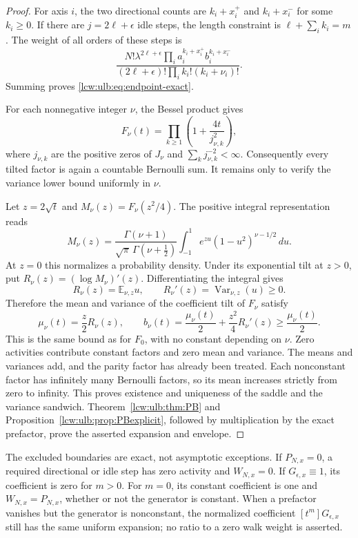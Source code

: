 \documentclass[11pt,letterpaper]{article}
\theoremstyle{remark}\newtheorem{remark}[theorem]{Remark}
\begin{document}
\begin{proof}
For axis $i$, the two directional counts are
$k_i+x_i^+$ and $k_i+x_i^-$ for some $k_i\ge0$. If there are
$j=2\ell+\epsilon$ idle steps, the length constraint is
$\ell+\sum_i k_i=m$. The weight of all orders of these steps is
\[
 \frac{N!\lambda^{2\ell+\epsilon}
           \prod_i a_i^{k_i+x_i^+}b_i^{k_i+x_i^-}}
      {(2\ell+\epsilon)!\prod_i k_i!(k_i+\nu_i)!}.
\]
Summing proves \eqref{lcw:ulb:eq:endpoint-exact}.

For each nonnegative integer $\nu$, the Bessel product
\cite{dlmfzeros} gives
\[
 F_\nu(t)=\prod_{k\ge1}
           \left(1+\frac{4t}{j_{\nu,k}^2}\right),
\]
where $j_{\nu,k}$ are the positive zeros of $J_\nu$ and
$\sum_k j_{\nu,k}^{-2}<\infty$. Consequently every tilted factor is
again a countable Bernoulli sum. It remains only to verify the
variance lower bound uniformly in $\nu$.

Let $z=2\sqrt t$ and $M_\nu(z)=F_\nu(z^2/4)$.
The positive integral representation
\cite[Eq.~10.32.2]{dlmfintegral} reads
\[
 M_\nu(z)=
 \frac{\Gamma(\nu+1)}{\sqrt\pi\,\Gamma(\nu+\tfrac12)}
 \int_{-1}^1 e^{zu}(1-u^2)^{\nu-1/2}\,du.
\]
At $z=0$ this normalizes a probability density. Under its exponential
tilt at $z>0$, put $R_\nu(z)=(\log M_\nu)'(z)$.
Differentiating the integral gives
\[
 R_\nu(z)=\mathbb E_{\nu,z}u,\qquad
 R_\nu'(z)=\operatorname{Var}_{\nu,z}(u)\ge0.
\]
Therefore the mean and variance of the coefficient tilt of $F_\nu$
satisfy
\[
 \mu_\nu(t)=\frac z2R_\nu(z),\qquad
 b_\nu(t)=\frac{\mu_\nu(t)}2+\frac{z^2}{4}R_\nu'(z)
             \ge\frac{\mu_\nu(t)}2.
\]
This is the same bound as for $F_0$, with no constant depending on
$\nu$. Zero activities contribute constant factors and zero mean and
variance. The means and variances add, and the parity factor has
already been treated. Each nonconstant factor has infinitely many
Bernoulli factors, so its mean increases strictly from zero to
infinity. This proves existence and uniqueness of the saddle and the
variance sandwich. Theorem~\ref{lcw:ulb:thm:PB} and
Proposition~\ref{lcw:ulb:prop:PBexplicit}, followed by multiplication by
the exact prefactor, prove the asserted expansion and envelope.
\end{proof}

The excluded boundaries are exact, not asymptotic exceptions.
If $P_{N,x}=0$, a required directional or idle step has zero
activity and $W_{N,x}=0$. If $G_{\epsilon,x}\equiv1$, its coefficient
is zero for $m>0$. For $m=0$, its constant coefficient is one and
$W_{N,x}=P_{N,x}$, whether or not the generator is constant.
When a prefactor vanishes but the generator is nonconstant, the
normalized coefficient $[t^m]G_{\epsilon,x}$ still has the same
uniform expansion; no ratio to a zero walk weight is asserted.
\end{document}
